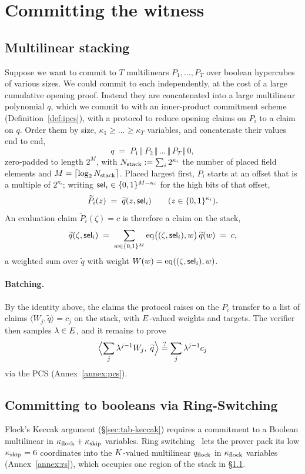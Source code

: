\section{Committing the witness}\label{sec:rs}

\subsection{Multilinear stacking}\label{sec:stacking}

Suppose we want to commit to $T$ multilinears $P_1,\dots,P_T$ over boolean hypercubes of various sizes. We could commit to each independently, at the cost of a large cumulative opening proof. Instead they are concatenated into a large multilinear polynomial $q$, which we commit to with an inner-product commitment scheme (Definition~\ref{def:ipcs}), with a protocol to reduce opening claims on $P_i$ to a claim on $q$. Order them by size, $\kappa_1\ge\dots\ge\kappa_T$ variables, and concatenate their values end to end,
\[
  q \;=\; P_1 \,\Vert\, P_2 \,\Vert\,\dots\,\Vert\, P_T \,\Vert\, 0,
\]
zero-padded to length $2^{M}$, with $N_{\mathrm{stack}}:=\textstyle\sum_i 2^{\kappa_i}$ the number of placed field elements and $M=\lceil\log_2N_{\mathrm{stack}}\rceil$. Placed largest first, $P_i$ starts at an offset that is a multiple of $2^{\kappa_i}$; writing $\mathsf{sel}_i\in\{0,1\}^{M-\kappa_i}$ for the high bits of that offset,
\[
  \widetilde P_i(z)\;=\;\widetilde q(z,\mathsf{sel}_i)\qquad(z\in\{0,1\}^{\kappa_i}).
\]
An evaluation claim $\widetilde P_i(\zeta)=c$ is therefore a claim on the stack,
\[
  \widetilde q(\zeta,\mathsf{sel}_i)\;=\;\sum_{w\in\{0,1\}^{M}}\operatorname{eq}\bigl((\zeta,\mathsf{sel}_i),w\bigr)\,\widetilde q(w)\;=\;c,
\]
a weighted sum over $\widetilde q$ with weight $W(w)=\operatorname{eq}((\zeta,\mathsf{sel}_i),w)$.

\paragraph{Batching.} By the identity above, the claims the protocol raises on the $P_i$ transfer to a list of claims $\langle W_j,\widetilde q\rangle=c_j$ on the stack, with $E$-valued weights and targets. The verifier then samples $\lambda\in E$, and it remains to prove
\[
  \Bigl\langle \sum_j\lambda^{j-1}W_j,\;\widetilde q\Bigr\rangle\stackrel{?}{=}\sum_j\lambda^{j-1}c_j
\]
via the PCS (Annex~\ref{annex:pcs}).

\subsection{Committing to booleans via Ring-Switching}\label{sec:ringswitch}

Flock's Keccak argument (\S\ref{sec:tab-keccak}) requires a commitment to a Boolean multilinear in $\kappa_{\mathrm{flock}}+\kappa_{\mathrm{skip}}$ variables. Ring switching~\cite{DP24} lets the prover pack its low $\kappa_{\mathrm{skip}}=6$ coordinates into the $K$-valued multilinear $q_{\mathrm{flock}}$ in $\kappa_{\mathrm{flock}}$ variables (Annex~\ref{annex:rs}), which occupies one region of the stack in \S\ref{sec:stacking}.
